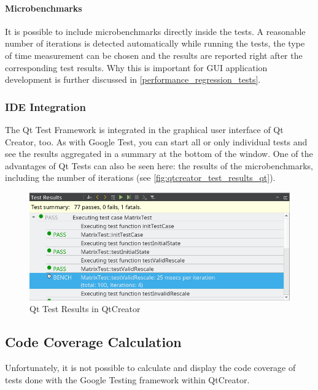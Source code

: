 \documentclass{scrreprt}
\begin{document}
\paragraph{Microbenchmarks}

It is possible to include microbenchmarks directly inside the tests. A reasonable number of iterations is detected automatically while running the tests, the type of time measurement can be chosen and the results are reported right after the corresponding test results. Why this is important for GUI application development is further discussed in \vref{performance_regression_tests}.


\subsubsection{IDE Integration}

The Qt Test Framework is integrated in the graphical user interface of Qt Creator, too. As with Google Test, you can start all or only individual tests and see the results aggregated in a summary at the bottom of the window. One of the advantages of Qt Tests can also be seen here: the results of the microbenchmarks, including the number of iterations (see \vref{fig:qtcreator_test_results_qt}).

\begin{figure}[h]
	\centering
	\includegraphics[width=1.0\textwidth]{img/qtcreator_test_results_qt}
	\caption[QtCreator Qt Test Results]{Qt Test Results in QtCreator}
	\label{fig:qtcreator_test_results_qt}
\end{figure}

\subsection{Code Coverage Calculation}
Unfortunately, it is not possible to calculate and display the code coverage of tests done with the Google Testing framework within QtCreator.
\end{document}
